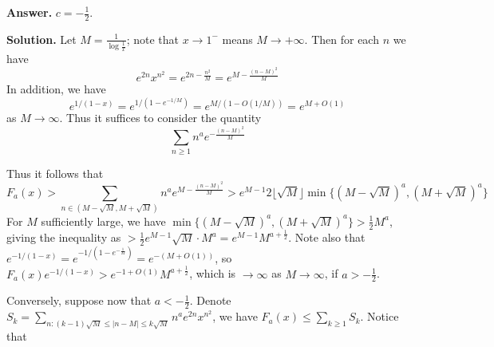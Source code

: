 \documentclass[11pt,a4paper]{article}
\begin{document}
\begin{enumerate}
        \textbf{Answer.} $c = -\frac 12$. 
        
        \textbf{Solution.} 
        Let $M = \frac{1}{\log \frac 1x}$; note that $x\to 1^-$ means $M \to +\infty$. 
        Then for each $n$ we have 
        \[
        e^{2n}x^{n^2} = e^{2n - \frac{n^2}{M}} = e^{M - \frac{(n - M)^2}{M}}
        \]
        In addition, we have 
        \[
        e^{1/(1 - x)} = e^{1/(1 - e^{-1/M})} = e^{M/(1 - O(1/M))} = e^{M+O(1)}
        \]
        as $M\to\infty$. 
        Thus it suffices to consider the quantity 
        \[
        \sum_{n\ge 1} n^ae^{-\frac{(n - M)^2}{M}}
        \]
        
        Thus it follows that 
        \[
        F_a(x) > \sum_{n\in  (M - \sqrt{M}, M + \sqrt{M})} n^a e^{M - \frac{(n - M)^2}{M}}
        > e^{M - 1} 2\lfloor \sqrt{M}\rfloor  \min\{(M - \sqrt{M})^a, (M +\sqrt{M})^a\}
        \]
        For $M$ sufficiently large, we have $\min\{(M - \sqrt{M})^a, (M +\sqrt{M})^a\} > \frac 12 M^a$, 
        giving the inequality as $> \frac 12 e^{M-1}\sqrt{M} \cdot M^a = e^{M - 1}M^{a + \frac 12}$. 
        Note also that $e^{-1/(1 - x)} = e^{-1/(1 - e^{-\frac 1M})} = e^{-(M + O(1))}$, 
        so $F_a(x)e^{-1/(1 - x)} > e^{-1 +O(1)} M^{ a + \frac 12}$, which is $\to\infty$ as $M\to\infty$, 
        if $a > -\frac 12$. 
        
        Conversely, suppose now that $a < -\frac 12$. Denote $S_k = \sum_{n: (k - 1)\sqrt{M}\le|n - M|\le k\sqrt{M}} n^ae^{2n}x^{n^2}$, 
        we have $F_a(x) \le \sum_{k\ge 1} S_k$. 
        Notice that 
        
    \end{enumerate}
\end{document}
